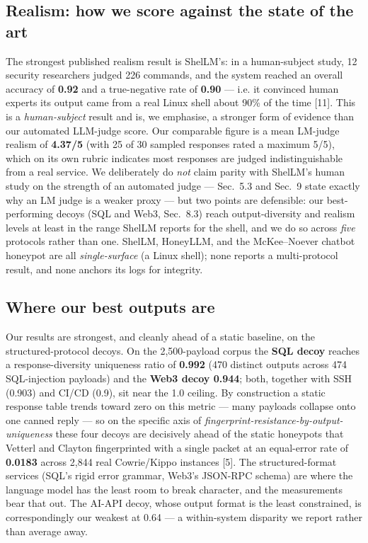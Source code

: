 \documentclass[conference]{IEEEtran}
\begin{document}
\subsection{Realism: how we score against the state of the art}

The strongest published realism result is ShelLM's: in a human-subject study, 12 security researchers judged 226 commands, and the system reached an overall accuracy of \textbf{0.92} and a true-negative rate of \textbf{0.90} --- i.e. it convinced human experts its output came from a real Linux shell about 90\% of the time [11]. This is a \emph{human-subject} result and is, we emphasise, a stronger form of evidence than our automated LLM-judge score. Our comparable figure is a mean LM-judge realism of \textbf{4.37/5} (with 25 of 30 sampled responses rated a maximum 5/5), which on its own rubric indicates most responses are judged indistinguishable from a real service. We deliberately do \emph{not} claim parity with ShelLM's human study on the strength of an automated judge --- Sec.~5.3 and Sec.~9 state exactly why an LM judge is a weaker proxy --- but two points are defensible: our best-performing decoys (SQL and Web3, Sec.~8.3) reach output-diversity and realism levels at least in the range ShelLM reports for the shell, and we do so across \emph{five} protocols rather than one. ShelLM, HoneyLLM, and the McKee--Noever chatbot honeypot are all \emph{single-surface} (a Linux shell); none reports a multi-protocol result, and none anchors its logs for integrity.

\subsection{Where our best outputs are}

Our results are strongest, and cleanly ahead of a static baseline, on the structured-protocol decoys. On the 2,500-payload corpus the \textbf{SQL decoy} reaches a response-diversity uniqueness ratio of \textbf{0.992} (470 distinct outputs across 474 SQL-injection payloads) and the \textbf{Web3 decoy 0.944}; both, together with SSH (0.903) and CI/CD (0.9), sit near the 1.0 ceiling. By construction a static response table trends toward zero on this metric --- many payloads collapse onto one canned reply --- so on the specific axis of \emph{fingerprint-resistance-by-output-uniqueness} these four decoys are decisively ahead of the static honeypots that Vetterl and Clayton fingerprinted with a single packet at an equal-error rate of \textbf{0.0183} across 2,844 real Cowrie/Kippo instances [5]. The structured-format services (SQL's rigid error grammar, Web3's JSON-RPC schema) are where the language model has the least room to break character, and the measurements bear that out. The AI-API decoy, whose output format is the least constrained, is correspondingly our weakest at 0.64 --- a within-system disparity we report rather than average away.
\end{document}
